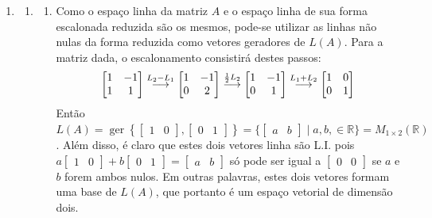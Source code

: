 \documentclass[12pt,a4paper]{article}
\newcommand*\ger[1]{\operatorname{ger}\left\{#1\right\}}
\newcommand*\R{\mathbb{R}}
\newcommand{\grstep}[2][\relax]{%
   \ensuremath{\mathrel{
       {\mathop{\longrightarrow}\limits^{#2\mathstrut}_{
                                     \begin{subarray}{l} #1 \end{subarray}}}}}}
\begin{document}
\begin{enumerate}
\item
\begin{enumerate}
\item
\begin{enumerate}
\item Como o espaço linha da matriz $A$ e o espaço linha de sua forma escalonada reduzida são os mesmos, pode-se utilizar as linhas não nulas da forma reduzida como vetores geradores de $L(A)$. Para a matriz dada, o escalonamento consistirá destes passos:
\begin{align*}
\begin{bmatrix}
1 & -1 \\
1 & 1
\end{bmatrix}
\grstep{ L_2 - L_1 }
\begin{bmatrix}
1 & -1 \\
0 & 2
\end{bmatrix}
\grstep{ \frac{1}{2}L_2 }
\begin{bmatrix}
1 & -1 \\
0 & 1
\end{bmatrix}
\grstep{ L_1 + L_2 }
\begin{bmatrix}
1 & 0 \\
0 & 1
\end{bmatrix}
\end{align*}
Então $L(A) = \ger{
\begin{bmatrix}
1 & 0
\end{bmatrix},
\begin{bmatrix}
0 & 1
\end{bmatrix}
} = \{ 
\begin{bmatrix}
a & b
\end{bmatrix} \mid a,b, \in \R
\} = M_{1 \times 2} (\R)$. Além disso, é claro que estes dois vetores linha são L.I. pois $a
\begin{bmatrix}
1 & 0
\end{bmatrix}
+b
\begin{bmatrix}
0 & 1
\end{bmatrix}
=
\begin{bmatrix}
a & b
\end{bmatrix}$ só pode ser igual a $
\begin{bmatrix}
0 & 0
\end{bmatrix}$ se $a$ e $b$ forem ambos nulos. Em outras palavras, estes dois vetores formam uma base de $L(A)$, que portanto é um espaço vetorial de dimensão dois.


\end{enumerate}
\end{enumerate}
\end{enumerate}
\end{document}
